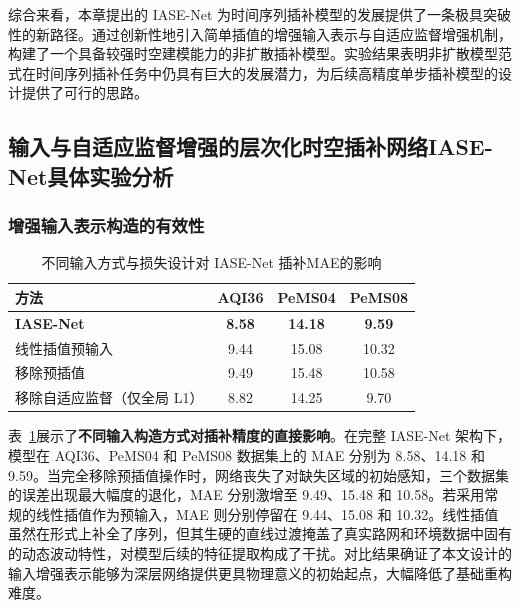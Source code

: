 综合来看，本章提出的 IASE-Net 为时间序列插补模型的发展提供了一条极具突破性的新路径。通过创新性地引入简单插值的增强输入表示与自适应监督增强机制，构建了一个具备较强时空建模能力的非扩散插补模型。实验结果表明非扩散模型范式在时间序列插补任务中仍具有巨大的发展潜力，为后续高精度单步插补模型的设计提供了可行的思路。





\subsection{输入与自适应监督增强的层次化时空插补网络IASE-Net具体实验分析}

\subsubsection{增强输入表示构造的有效性}
\begin{table}[H]
    \centering
    \caption{不同输入方式与损失设计对 IASE-Net 插补MAE的影响}
    \label{tab:ablation_IASE}
    \begin{tabular}{lccc}
        \toprule
        方法 & \textsf{AQI36} & \textsf{PeMS04} & \textsf{PeMS08} \\
        \midrule
        \textbf{IASE-Net}      & \textbf{8.58} & \textbf{14.18} & \textbf{9.59} \\
        线性插值预输入        & 9.44          & 15.08          & 10.32 \\
        移除预插值           & 9.49          & 15.48          & 10.58 \\
        移除自适应监督（仅全局 L1）& 8.82          & 14.25          & 9.70 \\
        \bottomrule
    \end{tabular}
\end{table}
表~\ref{tab:ablation_IASE}展示了\textbf{不同输入构造方式对插补精度的直接影响}。在完整 IASE-Net 架构下，模型在 AQI36、PeMS04 和 PeMS08 数据集上的 MAE 分别为 8.58、14.18 和 9.59。当完全移除预插值操作时，网络丧失了对缺失区域的初始感知，三个数据集的误差出现最大幅度的退化，MAE 分别激增至 9.49、15.48 和 10.58。若采用常规的线性插值作为预输入，MAE 则分别停留在 9.44、15.08 和 10.32。线性插值虽然在形式上补全了序列，但其生硬的直线过渡掩盖了真实路网和环境数据中固有的动态波动特性，对模型后续的特征提取构成了干扰。对比结果确证了本文设计的输入增强表示能够为深层网络提供更具物理意义的初始起点，大幅降低了基础重构难度。

